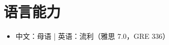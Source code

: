 \section{语言能力}
  \begin{itemize}[leftmargin=*]
    \item\small{中文：母语 | 英语：流利（雅思 7.0，GRE 336）}
  \end{itemize}